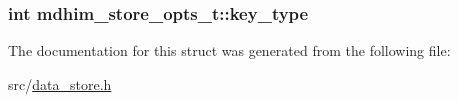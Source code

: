 \hypertarget{structmdhim__store__opts__t_ae199c9a5bce7a85d67921eb57a5a7fe4}{
\subsubsection[{key\-\_\-type}]{\setlength{\rightskip}{0pt plus 5cm}int mdhim\-\_\-store\-\_\-opts\-\_\-t\-::key\-\_\-type}}\label{da/d76/structmdhim__store__opts__t_ae199c9a5bce7a85d67921eb57a5a7fe4}


The documentation for this struct was generated from the following file\-:\begin{DoxyCompactItemize}
\item 
src/\hyperlink{data__store_8h}{data\-\_\-store.\-h}\end{DoxyCompactItemize}
